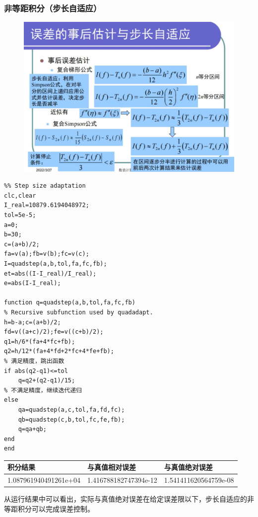 \documentclass[a4paper,12pt]{ctexart}
\begin{document}
\subsubsection{非等距积分（步长自适应）}
\begin{figure}[H]
    \centering
    \includegraphics[width=14cm]{第五章作业/feidengju.jpg}
\end{figure}
\begin{lstlisting}
%% Step size adaptation
clc,clear
I_real=10879.6194048972;
tol=5e-5;
a=0;
b=30;
c=(a+b)/2;
fa=v(a);fb=v(b);fc=v(c);
I=quadstep(a,b,tol,fa,fc,fb);
et=abs((I-I_real)/I_real);
e=abs(I-I_real);

function q=quadstep(a,b,tol,fa,fc,fb)
% Recursive subfunction used by quadadapt.
h=b-a;c=(a+b)/2;
fd=v((a+c)/2);fe=v((c+b)/2);
q1=h/6*(fa+4*fc+fb);
q2=h/12*(fa+4*fd+2*fc+4*fe+fb);
% 满足精度，跳出函数
if abs(q2-q1)<=tol
    q=q2+(q2-q1)/15;
% 不满足精度，继续迭代递归
else
    qa=quadstep(a,c,tol,fa,fd,fc);
    qb=quadstep(c,b,tol,fc,fe,fb);
    q=qa+qb;
end
end
\end{lstlisting}
\begin{table}[H]
    \centering
    \begin{tabular}{lll}
        \hline
        积分结果              & 与真值相对误差        & 与真值绝对误差        \\ \hline
        1.087961940491261e+04 & 1.416788182747394e-12 & 1.541411620564759e-08 \\ \hline
    \end{tabular}
\end{table}
\par
从运行结果中可以看出，实际与真值绝对误差在给定误差限以下，步长自适应的非等距积分可以完成误差控制。
\end{document}
